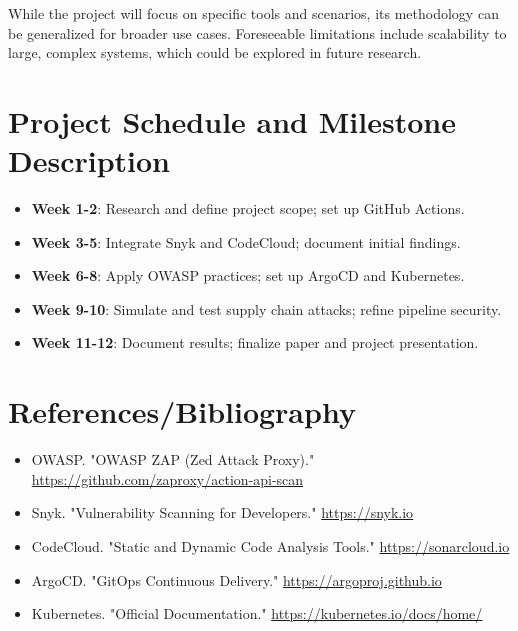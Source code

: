 \documentclass[a4paper,12pt]{article}
\begin{document}
While the project will focus on specific tools and scenarios, its methodology can be generalized for broader use cases. Foreseeable limitations include scalability to large, complex systems, which could be explored in future research.

\section{Project Schedule and Milestone Description}
\begin{itemize}
    \item \textbf{Week 1-2}: Research and define project scope; set up GitHub Actions.
    \item \textbf{Week 3-5}: Integrate Snyk and CodeCloud; document initial findings.
    \item \textbf{Week 6-8}: Apply OWASP practices; set up ArgoCD and Kubernetes.
    \item \textbf{Week 9-10}: Simulate and test supply chain attacks; refine pipeline security.
    \item \textbf{Week 11-12}: Document results; finalize paper and project presentation.
\end{itemize}

\section{References/Bibliography}
\begin{itemize}
    \item OWASP. "OWASP ZAP (Zed Attack Proxy)." \url{https://github.com/zaproxy/action-api-scan}
    \item Snyk. "Vulnerability Scanning for Developers." \url{https://snyk.io}
    \item CodeCloud. "Static and Dynamic Code Analysis Tools." \url{https://sonarcloud.io}
    \item ArgoCD. "GitOps Continuous Delivery." \url{https://argoproj.github.io}
    \item Kubernetes. "Official Documentation." \url{https://kubernetes.io/docs/home/}
\end{itemize}
\end{document}
